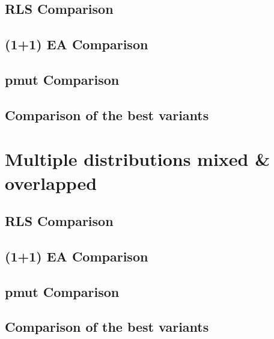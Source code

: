 \subsection{RLS Comparison}
\subsection{(1+1) EA Comparison}
\subsection{pmut Comparison}
\subsection{Comparison of the best variants}

\section{Multiple distributions mixed \& overlapped}
\subsection{RLS Comparison}
\subsection{(1+1) EA Comparison}
\subsection{pmut Comparison}
\subsection{Comparison of the best variants}